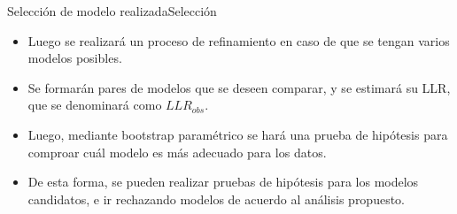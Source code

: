 \begin{frame}{Selección de modelo realizada}{Selección}
  \begin{itemize} 
    \itemsep1em

    \item Luego se realizará un proceso de refinamiento en caso de que se tengan varios modelos posibles. 

    \item Se formarán pares de modelos que se deseen comparar, y se estimará su LLR, que se denominará como $LLR_{obs}$. 

    \item Luego, mediante bootstrap paramétrico se hará una prueba de hipótesis para comproar cuál modelo es más adecuado para los datos.

    \item De esta forma, se pueden realizar pruebas de hipótesis para los modelos candidatos, e ir rechazando modelos de acuerdo al análisis propuesto. 

  \end{itemize}   
\end{frame}    

